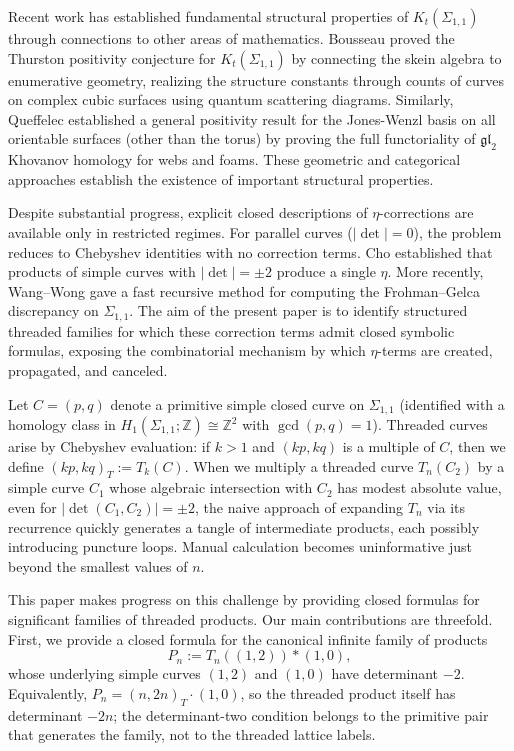 \documentclass[12pt]{article}
\begin{document}
Recent work has established fundamental structural properties of $K_t(\Sigma_{1,1})$ through connections to other areas of mathematics. Bousseau \cite{bousseau} proved the Thurston positivity conjecture for $K_t(\Sigma_{1,1})$ by connecting the skein algebra to enumerative geometry, realizing the structure constants through counts of curves on complex cubic surfaces using quantum scattering diagrams. Similarly, Queffelec \cite{queffelec} established a general positivity result for the Jones-Wenzl basis on all orientable surfaces (other than the torus) by proving the full functoriality of $\mathfrak{gl}_{2}$ Khovanov homology for webs and foams. These geometric and categorical approaches establish the existence of important structural properties.



Despite substantial progress, explicit closed descriptions of $\eta$-corrections are available only in restricted regimes. For parallel curves ($|\det|=0$), the problem reduces to Chebyshev identities with no correction terms. Cho \cite{cho} established that products of simple curves with $|\det|=\pm2$ produce a single $\eta$. More recently, Wang--Wong \cite{wangwong} gave a fast recursive method for computing the Frohman--Gelca discrepancy on $\Sigma_{1,1}$. The aim of the present paper is to identify structured threaded families for which these correction terms admit closed symbolic formulas, exposing the combinatorial mechanism by which $\eta$-terms are created, propagated, and canceled.

Let $C=(p,q)$ denote a primitive simple closed curve on $\Sigma_{1,1}$ (identified with a homology class in $H_1(\Sigma_{1,1};\mathbb{Z})\cong\mathbb{Z}^2$ with $\gcd(p,q)=1$). Threaded curves arise by Chebyshev evaluation: if $k>1$ and $(kp,kq)$ is a multiple of $C$, then we define $(kp,kq)_T := T_k(C)$. When we multiply a threaded curve $T_n(C_2)$ by a simple curve $C_1$ whose algebraic intersection with $C_2$ has modest absolute value, even for $|\det(C_1,C_2)|=\pm2$, the naive approach of expanding $T_n$ via its recurrence quickly generates a tangle of intermediate products, each possibly introducing puncture loops. Manual calculation becomes uninformative just beyond the smallest values of $n$.

This paper makes progress on this challenge by providing closed formulas for significant families of threaded products. Our main contributions are threefold. First, we provide a closed formula for the canonical infinite family of products
\[
P_n := T_n((1,2)) \ast(1,0),
\]
whose underlying simple curves $(1,2)$ and $(1,0)$ have determinant $-2$. Equivalently, \(P_n=(n,2n)_T\cdot(1,0)\), so the threaded product itself has determinant \(-2n\); the determinant-two condition belongs to the primitive pair that generates the family, not to the threaded lattice labels.
\end{document}
